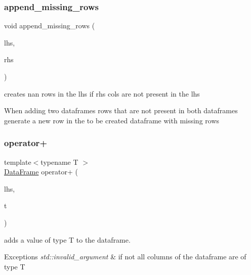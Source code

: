 \subsubsection{\texorpdfstring{append\+\_\+missing\+\_\+rows}{append\_missing\_rows}}
{\footnotesize\ttfamily void append\+\_\+missing\+\_\+rows (\begin{DoxyParamCaption}\item[{\hyperlink{classDataFrame}{Data\+Frame} \&}]{lhs,  }\item[{const \hyperlink{classDataFrame}{Data\+Frame} \&}]{rhs }\end{DoxyParamCaption})\hspace{0.3cm}{\ttfamily [friend]}}



creates nan rows in the lhs if rhs cols are not present in the lhs 

When adding two dataframes rows that are not present in both dataframes generate a new row in the to be created dataframe with missing rows \mbox{\label{classDataFrame_af0bd28935e605ba646d407b02e0a5850}} 
\subsubsection{\texorpdfstring{operator+}{operator+}}
{\footnotesize\ttfamily template$<$typename T $>$ \\
\hyperlink{classDataFrame}{Data\+Frame} operator+ (\begin{DoxyParamCaption}\item[{const \hyperlink{classDataFrame}{Data\+Frame} \&}]{lhs,  }\item[{const T \&}]{t }\end{DoxyParamCaption})\hspace{0.3cm}{\ttfamily [friend]}}



adds a value of type T to the dataframe. 


\begin{DoxyExceptions}{Exceptions}
{\em std\+::invalid\+\_\+argument} & if not all columns of the dataframe are of type T \\
\hline
\end{DoxyExceptions}
\mbox{\label{classDataFrame_a8c08b940f5d6a095ac079ef277133c1a}} 
